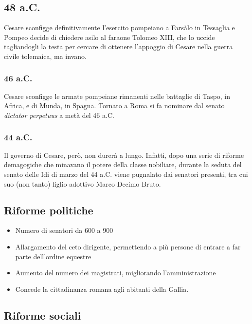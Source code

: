 \documentclass[10pt,a4paper]{article}
\begin{document}
	\subsection{48 a.C.}

	Cesare sconfigge definitivamente l'esercito pompeiano a Farsàlo in Tessaglia e Pompeo decide di chiedere asilo al faraone Tolomeo XIII, che lo uccide tagliandogli la testa per cercare di ottenere l'appoggio di Cesare nella guerra civile tolemaica, ma invano.

	\subsubsection{46 a.C.}

	Cesare sconfigge le armate pompeiane rimanenti nelle battaglie di Taspo, in Africa, e di Munda, in Spagna. Tornato a Roma si fa nominare dal senato \textit{dictator perpetuus} a metà del 46 a.C.

	\subsubsection{44 a.C.}

	Il governo di Cesare, però, non durerà a lungo. Infatti, dopo una serie di riforme demagogiche che minavano il potere della classe nobiliare, durante la seduta del senato delle Idi di marzo del 44 a.C. viene pugnalato dai senatori presenti, tra cui suo (non tanto) figlio adottivo Marco Decimo Bruto.

	\subsection{Riforme politiche}

	\begin{itemize}
	\item Numero di senatori da 600 a 900

	\item Allargamento del ceto dirigente, permettendo a più persone di entrare a far parte dell'ordine equestre

	\item Aumento del numero dei magistrati, migliorando l'amministrazione

	\item Concede la cittadinanza romana agli abitanti della Gallia.
\end{itemize}

\subsection{Riforme sociali}
\end{document}
